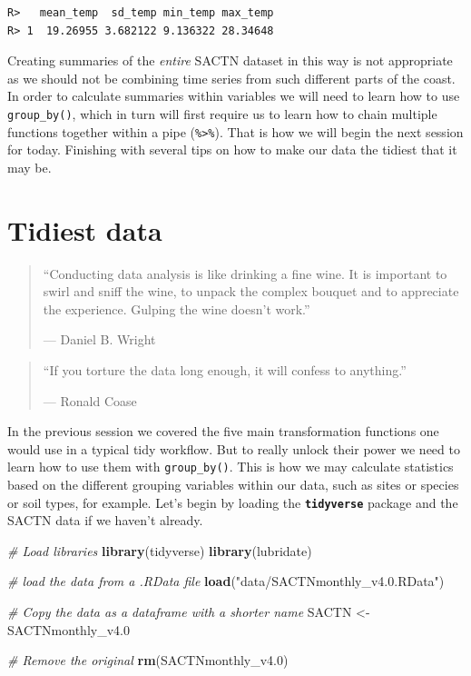 \documentclass[]{book}
\newenvironment{Shaded}{\begin{snugshade}}{\end{snugshade}}
\newcommand{\KeywordTok}[1]{\textcolor[rgb]{0.13,0.29,0.53}{\textbf{#1}}}
\newcommand{\DecValTok}[1]{\textcolor[rgb]{0.00,0.00,0.81}{#1}}
\newcommand{\StringTok}[1]{\textcolor[rgb]{0.31,0.60,0.02}{#1}}
\newcommand{\CommentTok}[1]{\textcolor[rgb]{0.56,0.35,0.01}{\textit{#1}}}
\newcommand{\NormalTok}[1]{#1}
\theoremstyle{definition}
\theoremstyle{definition}
\theoremstyle{definition}
\theoremstyle{remark}
\begin{document}
\begin{verbatim}
R>   mean_temp  sd_temp min_temp max_temp
R> 1  19.26955 3.682122 9.136322 28.34648
\end{verbatim}

Creating summaries of the \emph{entire} SACTN dataset in this way is not
appropriate as we should not be combining time series from such
different parts of the coast. In order to calculate summaries within
variables we will need to learn how to use \texttt{group\_by()}, which
in turn will first require us to learn how to chain multiple functions
together within a pipe (\texttt{\%\textgreater{}\%}). That is how we
will begin the next session for today. Finishing with several tips on
how to make our data the tidiest that it may be.

\chapter{Tidiest data}\label{tidiest}

\begin{quote}
``Conducting data analysis is like drinking a fine wine. It is important
to swirl and sniff the wine, to unpack the complex bouquet and to
appreciate the experience. Gulping the wine doesn't work.''

--- Daniel B. Wright
\end{quote}

\begin{quote}
``If you torture the data long enough, it will confess to anything.''

--- Ronald Coase
\end{quote}

In the previous session we covered the five main transformation
functions one would use in a typical tidy workflow. But to really unlock
their power we need to learn how to use them with \texttt{group\_by()}.
This is how we may calculate statistics based on the different grouping
variables within our data, such as sites or species or soil types, for
example. Let's begin by loading the \textbf{\texttt{tidyverse}} package
and the SACTN data if we haven't already.

\begin{Shaded}
\begin{Highlighting}[]
\CommentTok{# Load libraries}
\KeywordTok{library}\NormalTok{(tidyverse)}
\KeywordTok{library}\NormalTok{(lubridate)}

\CommentTok{# load the data from a .RData file}
\KeywordTok{load}\NormalTok{(}\StringTok{"data/SACTNmonthly_v4.0.RData"}\NormalTok{)}

\CommentTok{# Copy the data as a dataframe with a shorter name}
\NormalTok{SACTN <-}\StringTok{ }\NormalTok{SACTNmonthly_v4.}\DecValTok{0}

\CommentTok{# Remove the original}
\KeywordTok{rm}\NormalTok{(SACTNmonthly_v4.}\DecValTok{0}\NormalTok{)}
\end{Highlighting}
\end{Shaded}
\end{document}
